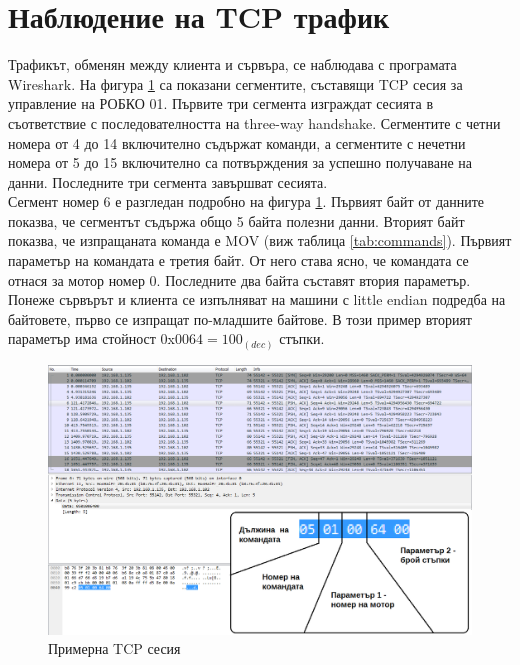\section{Наблюдение на TCP трафик}
Трафикът, обменян между клиента и сървъра, се наблюдава с програмата Wireshark. На фигура \ref{fig:TCP_session} са показани сегментите, съставящи TCP сесия за управление на РОБКО 01. Първите три сегмента изграждат сесията в съответствие с последователността на three-way handshake. Сегментите с четни номера от 4 до 14 включително съдържат команди, а сегментите с нечетни номера от 5 до 15 включително са потвърждения за успешно получаване на данни. Последните три сегмента завършват сесията.\\
\indent{}
Сегмент номер 6 е разгледан подробно на фигура \ref{fig:TCP_session}. Първият байт от данните показва, че сегментът съдържа общо 5 байта полезни данни. Вторият байт показва, че изпращаната команда е MOV (виж таблица \ref{tab:commands}). Първият параметър на командата е третия байт. От него става ясно, че командата се отнася за мотор номер 0. Последните два байта съставят втория параметър. Понеже сървърът и клиента се изпълняват на машини с little endian подредба на байтовете, първо се изпращат по-младшите байтове. В този пример вторият параметър има стойност 0x$0064 = 100_{(dec)}$ стъпки. 
\begin{figure}[!htb]
    \centering
    \includegraphics[width=\linewidth]{pictures/actual_packet.PNG}
    \caption{Примерна TCP сесия}
    \label{fig:TCP_session}
\end{figure}